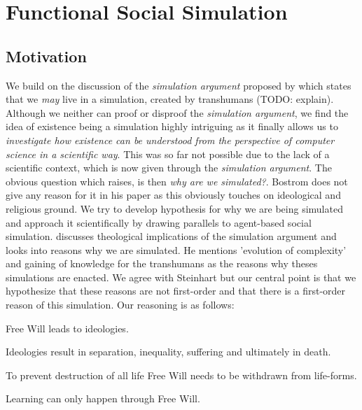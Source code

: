 \section{Functional Social Simulation}

\subsection{Motivation}
We build on the discussion of the \textit{simulation argument} proposed by \cite{bostrom_are_2003} which states that we \textit{may} live in a simulation, created by transhumans (TODO: explain). Although we neither can proof or disproof the \textit{simulation argument}, we find the idea of existence being a simulation highly intriguing as it finally allows us to \textit{investigate how existence can be understood from the perspective of computer science in a scientific way}. This was so far not possible due to the lack of a scientific context, which is now given through the \textit{simulation argument}. The obvious question which raises, is then \textit{why are we simulated?}. Bostrom does not give any reason for it in his paper as this obviously touches on ideological and religious ground. We try to develop hypothesis for why we are being simulated and approach it scientifically by drawing parallels to agent-based social simulation.
\cite{steinhart_theological_2010} discusses theological implications of the simulation argument and looks into reasons why we are simulated. He mentions 'evolution of complexity' and gaining of knowledge for the transhumans as the reasons why theses simulations are enacted. We agree with Steinhart but our central point is that we hypothesize that these reasons are not first-order and that there is a first-order reason of this simulation. Our reasoning is as follows:

\begin{theorem}
Free Will leads to ideologies.
\end{theorem}

\begin{theorem}
Ideologies result in separation, inequality, suffering and ultimately in death.
\end{theorem}

\begin{theorem}
To prevent destruction of all life Free Will needs to be withdrawn from life-forms.
\end{theorem}

\begin{theorem}
Learning can only happen through Free Will.
\end{theorem}

